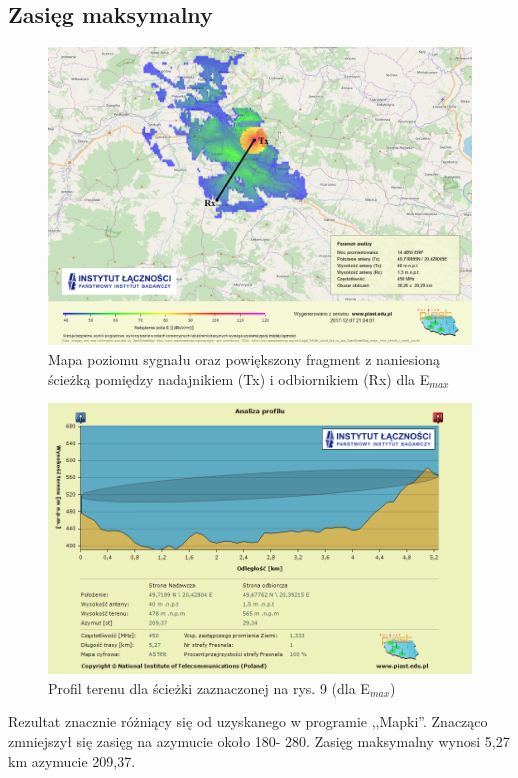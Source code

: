 \documentclass[12pt, a4paper, oneside]{article}
\begin{document}
\subsection{Zasięg maksymalny}
\begin{figure}[h!]
\centering
\includegraphics[scale=0.45]{pics/piast/f5.png}
\caption{Mapa poziomu sygnału oraz powiększony fragment z naniesioną ścieżką pomiędzy nadajnikiem (Tx) i odbiornikiem (Rx) dla E$_{max}$}
\end{figure}
\begin{figure}[h!]
\centering
\includegraphics[scale=0.6]{pics/piast/f3.png}
\caption{Profil terenu dla ścieżki zaznaczonej na rys. 9 (dla E$_{max}$)}
\end{figure}
Rezultat znacznie różniący się od uzyskanego w programie ,,Mapki''. Znacząco zmniejszył się zasięg na azymucie około 180\textdegree - 280\textdegree. Zasięg maksymalny wynosi 5,27 km azymucie 209,37\textdegree.
\clearpage
\end{document}
